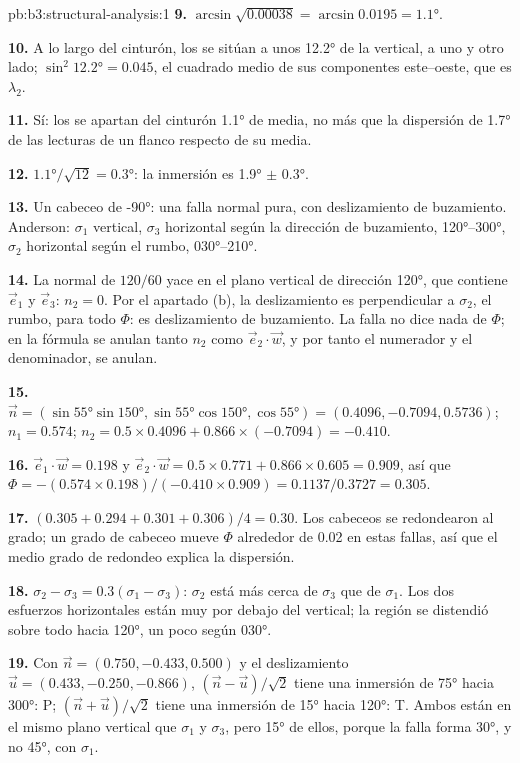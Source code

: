 \begin{solution}{pb:b3:structural-analysis:1}
\textbf{9.} $\arcsin\sqrt{0.00038} = \arcsin0.0195 = \ang{1.1}$.

\textbf{10.} A lo largo del cinturón, los  se sitúan a unos \ang{12.2} de la vertical,
a uno y otro lado; $\sin^2\ang{12.2} = 0.045$, el cuadrado medio de sus
componentes este--oeste, que es $\lambda_2$.

\textbf{11.} Sí: los  se apartan del cinturón \ang{1.1} de media, no
más que la dispersión de \ang{1.7} de las lecturas de un flanco respecto de su media.

\textbf{12.} $\ang{1.1}/\sqrt{12} = \ang{0.3}$: la inmersión es \ang{1.9} $\pm$
\ang{0.3}.

\textbf{13.} Un cabeceo de \ang{-90}: una falla normal pura, con deslizamiento de buzamiento. Anderson:
$\sigma_1$ vertical, $\sigma_3$ horizontal según la dirección de buzamiento,
\ang{120}--\ang{300}, $\sigma_2$ horizontal según el rumbo,
\ang{030}--\ang{210}.

\textbf{14.} La normal de $120/60$ yace en el plano vertical de dirección
\ang{120}, que contiene $\vec e_1$ y $\vec e_3$: $n_2 = 0$. Por el apartado (b), la
deslizamiento es perpendicular a $\sigma_2$, el rumbo, para todo $\Phi$: es
deslizamiento de buzamiento. La falla no dice nada de $\Phi$; en la fórmula se anulan tanto $n_2$ como
$\vec e_2\cdot\vec w$, y por tanto el numerador y el denominador, se anulan.

\textbf{15.} $\vec n = (\sin\ang{55}\sin\ang{150}, \sin\ang{55}\cos\ang{150},
\cos\ang{55}) = (0.4096, -0.7094, 0.5736)$; $n_1 = 0.574$; $n_2 = 0.5\times
0.4096 + 0.866\times(-0.7094) = -0.410$.

\textbf{16.} $\vec e_1\cdot\vec w = 0.198$ y $\vec e_2\cdot\vec w = 0.5\times
0.771 + 0.866\times0.605 = 0.909$, así que $\Phi = -(0.574\times0.198)/(-0.410\times
0.909) = 0.1137/0.3727 = 0.305$.

\textbf{17.} $(0.305 + 0.294 + 0.301 + 0.306)/4 = 0.30$. Los cabeceos se
redondearon al grado; un grado de cabeceo mueve $\Phi$ alrededor de 0.02 en estas
fallas, así que el medio grado de redondeo explica la dispersión.

\textbf{18.} $\sigma_2 - \sigma_3 = 0.3(\sigma_1 - \sigma_3)$: $\sigma_2$ está
más cerca de $\sigma_3$ que de $\sigma_1$. Los dos esfuerzos horizontales están muy
por debajo del vertical; la región se distendió sobre todo hacia \ang{120}, un
poco según \ang{030}.

\textbf{19.} Con $\vec n = (0.750, -0.433, 0.500)$ y el deslizamiento $\vec u =
(0.433, -0.250, -0.866)$, $(\vec n - \vec u)/\sqrt2$ tiene una inmersión de \ang{75} hacia
\ang{300}: P; $(\vec n + \vec u)/\sqrt2$ tiene una inmersión de \ang{15} hacia \ang{120}:
T. Ambos están en el mismo plano vertical que $\sigma_1$ y $\sigma_3$, pero
\ang{15} de ellos, porque la falla forma \ang{30}, y no \ang{45}, con
$\sigma_1$.


\end{solution}
